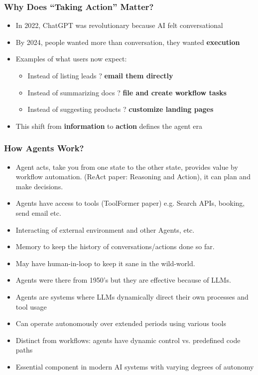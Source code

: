 \begin{frame}[fragile]\frametitle{Why Does ``Taking Action'' Matter?}
\begin{itemize}
    \item In 2022, ChatGPT was revolutionary because AI felt conversational
    \item By 2024, people wanted more than conversation, they wanted \textbf{execution}
    \item Examples of what users now expect:
    \begin{itemize}
        \item Instead of listing leads ? \textbf{email them directly}
        \item Instead of summarizing docs ? \textbf{file and create workflow tasks}
        \item Instead of suggesting products ? \textbf{customize landing pages}
    \end{itemize}
    \item This shift from \textbf{information} to \textbf{action} defines the agent era
\end{itemize}
\end{frame}


\begin{frame}[fragile]\frametitle{How Agents Work?}
    \begin{itemize}
        \item Agent acts, take you from one state to the other state, provides value by workflow automation. (ReAct paper: Reasoning and Action), it can plan and make decisions.
		\item Agents have access to tools (ToolFormer paper) e.g. Search APIs, booking, send email etc.
		\item Interacting of external environment and other Agents, etc.
		\item Memory to keep the history of conversations/actions done so far.
		\item May have human-in-loop to keep it sane in the wild-world.
		\item Agents were there from 1950's but they are effective because of LLMs.
        \item Agents are systems where LLMs dynamically direct their own processes and tool usage
        \item Can operate autonomously over extended periods using various tools
        \item Distinct from workflows: agents have dynamic control vs. predefined code paths
        \item Essential component in modern AI systems with varying degrees of autonomy
    \end{itemize}
\end{frame}

